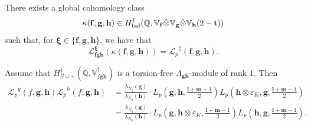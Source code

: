 \documentclass[10pt,a4paper]{amsart}
\newcommand{\Lp}{{\mathscr{L}_p}}
\DeclareMathOperator{\bal}{bal}
\newcommand{\bb}{\mathbb}
\newcommand{\cl}{\mathcal}
\newcommand{\hf}{{\mathbf{f}}}
\newcommand{\hg}{{\mathbf{g}}}
\newcommand{\hh}{{\mathbf h}}
\newcommand{\res}{\mathrm{res}}
\begin{document}
\begin{theorem}\label{thm:reclawdiagonalcycles}
There exists a global cohomology class
\[
\kappa(\hf,\hg,\hh) \in H^1_{\bal}(\mathbb Q, \mathbb V_{\hf} \hat \otimes \mathbb V_{\hg} \hat \otimes \mathbb V_{\hh}(2-{\bf t}))
\]
such that, for $\bm{\xi}\in \lbrace \hf,\hg,\hh\rbrace$,
we have that
\[
\mathcal L_{\hf\hg\hh}^{\bm{\xi}}(\kappa(\hf, \hg, \hh)) = \Lp^{\xi}(\hf, \hg, \hh).
\]

\end{theorem}

\begin{corollary}
    Assume that $H^1_{\cl{G}\cup +}(\bb{Q}, \bb{V}_{f\hg\hh}^\dagger)$ is a torsion-free $\Lambda_{\hg\hh}$-module of rank $1$. Then
    \begin{align*}
     \Lp^g(f,\hg,\hh)\Lp^h(f,\hg,\hh)&=\frac{\lambda_{N_g}(\hg)}{\lambda_{N_h}(\hh)}\cdot L_p\left(\hg,\hh,\frac{\mathbf{l}+\mathbf{m}-1}{2}\right)L_p\left(\hh\otimes\varepsilon_K,\hg,\frac{\mathbf{l}+\mathbf{m}-1}{2}\right) \\ &=\frac{\lambda_{N_g}(\hg)}{\lambda_{N_h}(\hh)}\cdot L_p\left(\hg,\hh\otimes\varepsilon_K,\frac{\mathbf{l}+\mathbf{m}-1}{2}\right)L_p\left(\hh,\hg,\frac{\mathbf{l}+\mathbf{m}-1}{2}\right).
    \end{align*}
\end{corollary}
\end{document}

